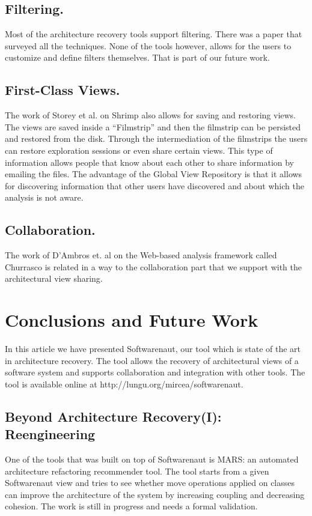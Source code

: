 \documentclass[preprint,12pt]{elsarticle}
\begin{document}
\subsection {Filtering.} Most of the architecture recovery tools support filtering. There was a paper that surveyed all the techniques. None of the tools however, allows for the users to customize and define filters themselves. That is part of our future work. 

\subsection {First-Class Views.} The work of Storey et al. on Shrimp also allows for saving and restoring views. The views are saved inside a “Filmstrip” and then the filmstrip can be persisted and restored from the disk. Through the intermediation of the filmstrips the users can restore exploration sessions or even share certain views. This type of information allows people that know about each other to share information by emailing the files. The advantage of the Global View Repository is that it allows for discovering information that other users have discovered and about which the analysis is not aware. 


\subsection {Collaboration.} The work of D’Ambros et. al on the Web-based analysis framework called Churrasco is related in a way to the collaboration part that we support with the architectural view sharing. 

\newpage
\section {Conclusions and Future Work}
\label {sec:conc}

In this article we have presented Softwarenaut, our tool which is state of the art in architecture recovery. The tool allows the recovery of architectural views of a software system and supports collaboration and integration with other tools. The tool is available online at http://lungu.org/mircea/softwarenaut.

\subsection {Beyond Architecture Recovery(I): Reengineering}
One of the tools that was built on top of Softwarenaut is MARS: an automated architecture refactoring recommender tool. The tool starts from a given Softwarenaut view and tries to see whether move operations applied on classes can improve the architecture of the system by increasing coupling and decreasing cohesion. The work is still in progress and needs a formal validation. 
\end{document}
